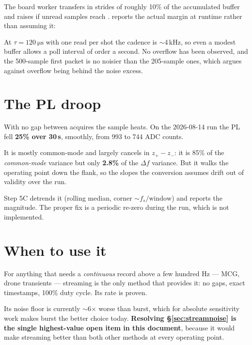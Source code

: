 The board worker transfers in strides of roughly 10\% of the accumulated buffer and
raises if unread samples reach .  reports the
actual margin at runtime rather than assuming it:

\begin{center}
\end{center}

At $\tau=\SI{120}{\micro\second}$ with one read per shot the cadence is
$\sim$4\,kHz, so even a modest buffer allows a poll interval of order a second.
No overflow has been observed, and the 500-sample first packet is no noisier than
the 205-sample ones, which argues against overflow being behind the noise excess.

\section{The PL droop}
\label{sec:droop}

\begin{openbox}
With no gap between acquires the sample heats. On the 2026-08-14 run the PL fell
\textbf{25\% over 30\,s}, smoothly, from 993 to 744 ADC counts.

It is mostly common-mode and largely cancels in $z_+-z_-$: it is 85\% of the
\emph{common-mode} variance but only \textbf{2.8\%} of the $\Delta f$ variance. But
it walks the operating point down the flank, so the slopes the conversion assumes
drift out of validity over the run.

Step 5C detrends it (rolling median, corner $\sim f_s/\text{window}$) and reports
the magnitude. The proper fix is a periodic re-zero during the run, which is not
implemented.
\end{openbox}

\section{When to use it}

For anything that needs a \emph{continuous} record above a few hundred Hz --- MCG,
drone transients --- streaming is the only method that provides it: no gaps, exact
timestamps, 100\% duty cycle. Its rate is proven.

Its noise floor is currently $\sim$6$\times$ worse than burst, which for absolute
sensitivity work makes burst the better choice today. \textbf{Resolving
\S\ref{sec:streamnoise} is the single highest-value open item in this document},
because it would make streaming better than both other methods at every operating
point.
